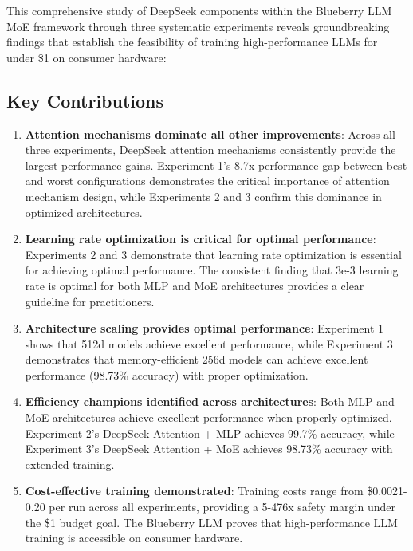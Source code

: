\documentclass[11pt,a4paper]{article}
\begin{document}
This comprehensive study of DeepSeek components within the Blueberry LLM MoE framework through three systematic experiments reveals groundbreaking findings that establish the feasibility of training high-performance LLMs for under \$1 on consumer hardware:

\subsection{Key Contributions}

\begin{enumerate}
    \item \textbf{Attention mechanisms dominate all other improvements}: Across all three experiments, DeepSeek attention mechanisms consistently provide the largest performance gains. Experiment 1's 8.7x performance gap between best and worst configurations demonstrates the critical importance of attention mechanism design, while Experiments 2 and 3 confirm this dominance in optimized architectures.
    
    \item \textbf{Learning rate optimization is critical for optimal performance}: Experiments 2 and 3 demonstrate that learning rate optimization is essential for achieving optimal performance. The consistent finding that 3e-3 learning rate is optimal for both MLP and MoE architectures provides a clear guideline for practitioners.
    
    \item \textbf{Architecture scaling provides optimal performance}: Experiment 1 shows that 512d models achieve excellent performance, while Experiment 3 demonstrates that memory-efficient 256d models can achieve excellent performance (98.73\% accuracy) with proper optimization.
    
    \item \textbf{Efficiency champions identified across architectures}: Both MLP and MoE architectures achieve excellent performance when properly optimized. Experiment 2's DeepSeek Attention + MLP achieves 99.7\% accuracy, while Experiment 3's DeepSeek Attention + MoE achieves 98.73\% accuracy with extended training.
    
    \item \textbf{Cost-effective training demonstrated}: Training costs range from \$0.0021-0.20 per run across all experiments, providing a 5-476x safety margin under the \$1 budget goal. The Blueberry LLM proves that high-performance LLM training is accessible on consumer hardware.
    

\end{enumerate}
\end{document}
